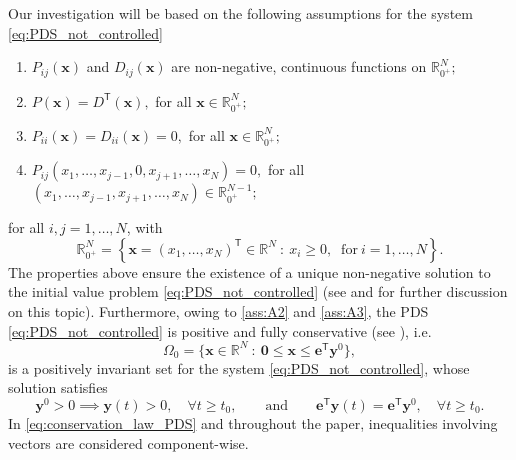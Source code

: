 \documentclass[10pt]{article}
\theoremstyle{remark}
\newcommand{\tpose}{^\mathsf{T}}
\theoremstyle{definition}
\theoremstyle{remark}
\begin{document}
Our investigation will be based on the following assumptions for the system \eqref{eq:PDS_not_controlled}
\begin{enumerate}[label=(A$_{\arabic*}$)]
    \item\label{ass:A1} $P_{ij}(\bm{x})$ and $D_{ij}(\bm{x})$ are non-negative, continuous functions on $\mathbb{R}_{0^+}^N;$  %
    \item\label{ass:A2} $P(\bm{x})=D\tpose(\bm{x}),$ for all $\bm{x}\in \mathbb{R}^{N}_{0^+};$
    \item\label{ass:A3} $P_{ii}(\bm{x})=D_{ii}(\bm{x})=0,$ for all $\bm{x}\in \mathbb{R}^{N}_{0^+};$
    \item\label{ass:A4} $P_{ij}(x_1,\dots,x_{j-1},0,x_{j+1},\dots,x_N)=0,$ for all $(x_1,\dots,x_{j-1},x_{j+1},\dots,x_N)\in \mathbb{R}^{N-1}_{0^+};$
\end{enumerate} 
for all $i,j=1,\dots,N$, with
\begin{equation*}
     \mathbb{R}^{N}_{0^+}=\left\{\bm{x}=(x_1,\dots,x_N)\tpose\in\mathbb{R}^N \ : \ x_i\geq 0, \;\; \mbox{for} \ i=1,\dots,N\right\}.
\end{equation*}
The properties above ensure the existence of a unique non-negative solution to the initial value problem \eqref{eq:PDS_not_controlled} (see \cite[Theorem 3.3]{Formaggia_Scotti} and \cite[Theorem 1.2]{TORLO2022} for further discussion on this topic). Furthermore, owing to \ref{ass:A2} and \ref{ass:A3}, the PDS \eqref{eq:PDS_not_controlled} is positive and fully conservative (see \cite[Definitions 1.1-1.2]{Kopecz2018}), i.e.
\begin{equation}\label{eq:Omega0}
    \Omega_0=\{\bm{x}\in\mathbb{R}^N \ : \ \bm{0}\leq \bm{x} \leq \bm{e}\tpose \bm{y}^0  \},
\end{equation}
is a positively invariant set for the system \eqref{eq:PDS_not_controlled}, whose solution satisfies
\begin{equation}\label{eq:conservation_law_PDS}
    \bm{y}^0>0 \implies \bm{y}(t)>0, \quad \forall t \geq t_0, \qquad \mbox{and} \qquad
    \bm{e}\tpose\bm{y}(t)=\bm{e}\tpose\bm{y}^0, \quad \forall t \geq t_0.
\end{equation}
In \eqref{eq:conservation_law_PDS} and throughout the paper, inequalities involving vectors are considered component-wise. 
\end{document}
